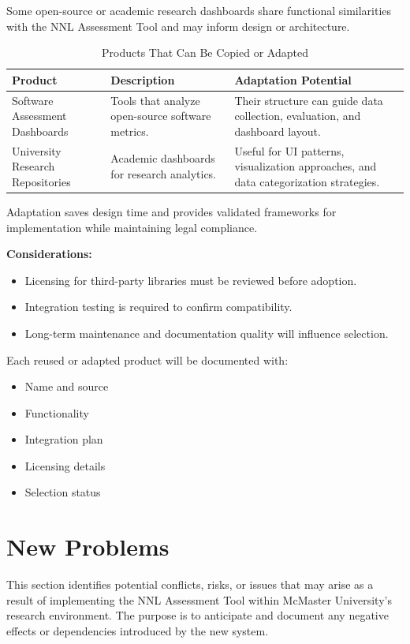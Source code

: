 \documentclass[12pt]{article}
\begin{document}
Some open-source or academic research dashboards share functional similarities with the NNL Assessment Tool and may inform design or architecture.

\begin{table}[H]
\caption{Products That Can Be Copied or Adapted}
\centering
\begin{tabularx}{\textwidth}{|p{3cm}|X|X|}
\hline
\textbf{Product} & \textbf{Description} & \textbf{Adaptation Potential} \\ \hline
Software Assessment Dashboards & Tools that analyze open-source software metrics. & Their structure can guide data collection, evaluation, and dashboard layout. \\ \hline
University Research Repositories & Academic dashboards for research analytics. & Useful for UI patterns, visualization approaches, and data categorization strategies. \\ \hline
\end{tabularx}
\end{table}

Adaptation saves design time and provides validated frameworks for implementation while maintaining legal compliance.

\textbf{Considerations:}
\begin{itemize}
    \item Licensing for third-party libraries must be reviewed before adoption.
    \item Integration testing is required to confirm compatibility.
    \item Long-term maintenance and documentation quality will influence selection.
\end{itemize}

Each reused or adapted product will be documented with:
\begin{itemize}
    \item Name and source
    \item Functionality
    \item Integration plan
    \item Licensing details
    \item Selection status
\end{itemize}


\section{New Problems}

This section identifies potential conflicts, risks, or issues that may arise as a result of implementing the NNL Assessment Tool within McMaster University’s research environment. The purpose is to anticipate and document any negative effects or dependencies introduced by the new system.
\end{document}
